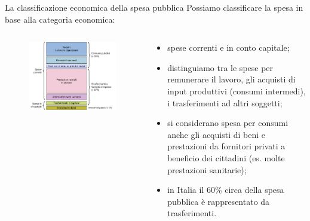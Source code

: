 \documentclass[aspectratio=64,11pt]{beamer}
\begin{document}
\begin{frame}{La classificazione economica della spesa pubblica}
Possiamo classificare la spesa in base alla categoria economica:
\begin{columns}
\begin{column}{.6\columnwidth}
\begin{figure}
\centering
\includegraphics[width=1.1\textwidth]{./figure/spesa-pubblica-classificazione-economica-color.pdf}
\end{figure}
\end{column}

\begin{column}{.4\columnwidth}
\footnotesize
\begin{itemize}
\item spese correnti e in conto capitale;
\item distinguiamo tra le spese per remunerare il lavoro, gli acquisti di input produttivi (consumi intermedi), i trasferimenti ad altri soggetti;
\item si considerano spesa per consumi anche gli acquisti di beni e prestazioni da fornitori privati a beneficio dei cittadini (es. molte prestazioni sanitarie);
\item in Italia il 60\% circa della spesa pubblica è rappresentato da trasferimenti.
\end{itemize}
\end{column}
\end{columns}
\end{frame}
\end{document}
